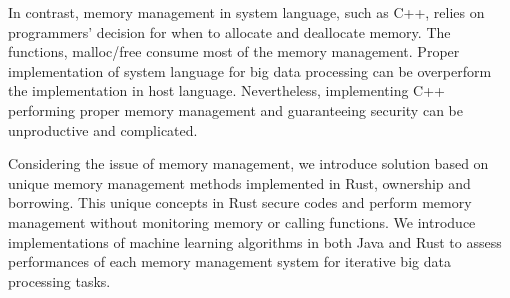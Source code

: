 In contrast, memory management in system language, such as C++, relies on programmers’ decision for when to allocate and deallocate memory. 
The functions, malloc/free consume most of the memory management. Proper implementation of system language for big data processing can be overperform the implementation in host language.
Nevertheless, implementing C++ performing proper memory management and guaranteeing security can be unproductive and complicated. 

Considering the issue of memory management, we introduce solution based on unique memory management methods implemented in Rust, ownership and borrowing.
This unique concepts in Rust secure codes and perform memory management without monitoring memory or calling functions. We introduce implementations of
machine learning algorithms in both Java and Rust to assess performances of each memory management system for iterative big data processing tasks.



